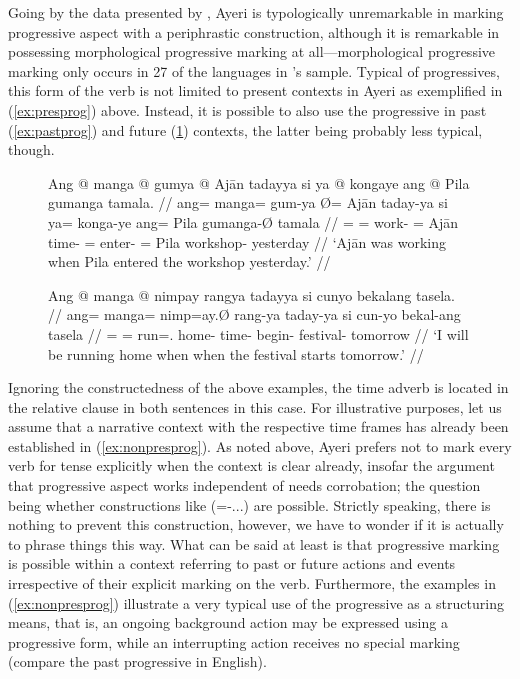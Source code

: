 Going by the data presented by \citet[91]{dahl1985}, Ayeri is typologically
unremarkable in marking progressive aspect with a periphrastic construction,
although it is remarkable in possessing morphological progressive marking at
all---morphological progressive marking only occurs in 27\pct{} of the
languages in \citet{dahl1985}'s sample. Typical of progressives, this form of
the verb is not limited to present contexts in Ayeri as exemplified in
(\ref{ex:presprog}) above. Instead, it is possible to also use the progressive
in past (\ref{ex:pastprog}) and future (\ref{ex:futprog}) contexts, the latter
being probably less typical, though.

\begin{figure}
\pex\label{ex:nonpresprog}
\a\label{ex:pastprog}\begingl
	\gla Ang @ manga @ gumya {} @ Ajān tadayya si ya @ kongaye ang @ Pila
		gumanga tamala. //
	\glb ang= manga= gum-ya Ø= Ajān taday-ya si ya= konga-ye ang= Pila 
		gumanga-Ø tamala //
	\glc \AgtT{}= \Prog{}= work-\Tsg{} \Top{}= Ajān time-\Loc{} \Rel{} \LocT{}=
		enter-\TsgF{} \Aarg{}= Pila workshop-\Top{} yesterday //
	\glft `Ajān was working when Pila entered the workshop yesterday.' //
\endgl

\a\label{ex:futprog}\begingl
	\gla Ang @ manga @ nimpay rangya tadayya si cunyo bekalang tasela. //
	\glb ang= manga= nimp=ay.Ø rang-ya taday-ya si cun-yo bekal-ang tasela //
	\glc \AgtT{}= \Prog{}= run=\Fsg{}.\Top{} home-\Loc{}
		time-\Loc{} \Rel{} begin-\TsgN{} festival-\Aarg{} tomorrow //
	\glft `I will be running home when when the festival starts 
		tomorrow.' //
\endgl
\xe
\end{figure}

Ignoring the constructedness of the above examples, the time adverb is located 
in the relative clause in both sentences in this case. For illustrative 
purposes, let us assume that a narrative context with the respective time 
frames has already been established in (\ref{ex:nonpresprog}). As noted above, 
Ayeri prefers not to mark every verb for tense explicitly when the context is 
clear already, insofar the argument that progressive aspect works independent 
of  needs corrobation; the question being whether constructions like 
 (\Prog{}=\Pst{}-...) are possible. Strictly 
speaking, there is nothing to prevent this construction, however, we have to 
wonder if it is actually  to phrase things this way. What can be 
said at least is that progressive marking is possible within a context 
referring to past or future actions and events irrespective of their explicit 
marking on the verb. Furthermore, the examples in (\ref{ex:nonpresprog}) 
illustrate a very typical use of the progressive as a structuring means, that 
is, an ongoing background action may be expressed using a progressive form, 
while an interrupting action receives no special marking (compare the past 
progressive in English).

